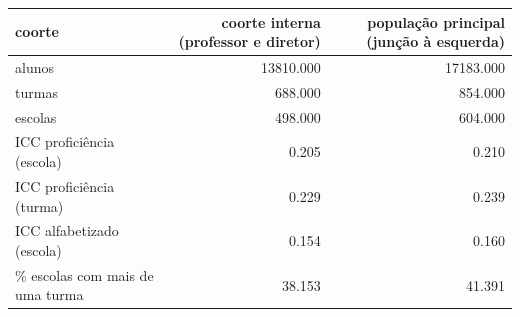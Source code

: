 \begin{tabular}{lrr}
\toprule
coorte & coorte interna (professor e diretor) & população principal (junção à esquerda) \\
\midrule
alunos & 13810.000 & 17183.000 \\
turmas & 688.000 & 854.000 \\
escolas & 498.000 & 604.000 \\
ICC proficiência (escola) & 0.205 & 0.210 \\
ICC proficiência (turma) & 0.229 & 0.239 \\
ICC alfabetizado (escola) & 0.154 & 0.160 \\
\% escolas com mais de uma turma & 38.153 & 41.391 \\
\bottomrule
\end{tabular}
